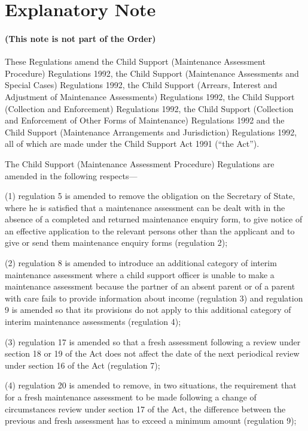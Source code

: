 \documentclass[12pt,a4paper]{article}
\begin{document}
\part{Explanatory Note}

\renewcommand\parthead{--- Explanatory Note}

\subsection*{(This note is not part of the Order)}

 These Regulations amend the Child Support (Maintenance Assessment Procedure) Regulations 1992, the Child Support (Maintenance Assessments and Special Cases) Regulations 1992, the Child Support (Arrears, Interest and Adjustment of Maintenance Assessments) Regulations 1992, the Child Support (Collection and Enforcement) Regulations 1992, the Child Support (Collection and Enforcement of Other Forms of Maintenance) Regulations 1992 and the Child Support (Maintenance Arrangements and Jurisdiction) Regulations 1992, all of which are made under the Child Support Act 1991 (“the Act”).

 The Child Support (Maintenance Assessment Procedure) Regulations are amended in the following respects---

 (1) regulation 5 is amended to remove the obligation on the Secretary of State, where he is satisfied that a maintenance assessment can be dealt with in the absence of a completed and returned maintenance enquiry form, to give notice of an effective application to the relevant persons other than the applicant and to give or send them maintenance enquiry forms (regulation 2);

 (2) regulation 8 is amended to introduce an additional category of interim maintenance assessment where a child support officer is unable to make a maintenance assessment because the partner of an absent parent or of a parent with care fails to provide information about income (regulation 3) and regulation 9 is amended so that its provisions do not apply to this additional category of interim maintenance assessments (regulation 4);

 (3) regulation 17 is amended so that a fresh assessment following a review under section 18 or 19 of the Act does not affect the date of the next periodical review under section 16 of the Act (regulation 7);

 (4) regulation 20 is amended to remove, in two situations, the requirement that for a fresh maintenance assessment to be made following a change of circumstances review under section 17 of the Act, the difference between the previous and fresh assessment has to exceed a minimum amount (regulation 9);
\end{document}
